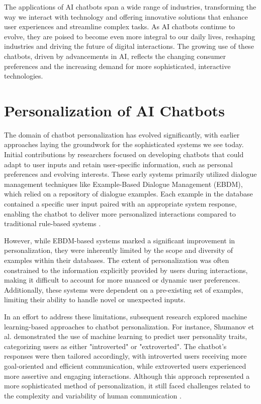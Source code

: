 The applications of AI chatbots span a wide range of industries, transforming the way we interact with technology and offering innovative solutions that enhance user experiences and streamline complex tasks. As AI chatbots continue to evolve, they are poised to become even more integral to our daily lives, reshaping industries and driving the future of digital interactions. The growing use of these chatbots, driven by advancements in AI, reflects the changing consumer preferences and the increasing demand for more sophisticated, interactive technologies.

\section{Personalization of AI Chatbots}

The domain of chatbot personalization has evolved significantly, with earlier approaches laying the groundwork for the sophisticated systems we see today. Initial contributions by researchers focused on developing chatbots that could adapt to user inputs and retain user-specific information, such as personal preferences and evolving interests. These early systems primarily utilized dialogue management techniques like Example-Based Dialogue Management (EBDM), which relied on a repository of dialogue examples. Each example in the database contained a specific user input paired with an appropriate system response, enabling the chatbot to deliver more personalized interactions compared to traditional rule-based systems \cite{kim2015acquisition, bang2015example}.

However, while EBDM-based systems marked a significant improvement in personalization, they were inherently limited by the scope and diversity of examples within their databases. The extent of personalization was often constrained to the information explicitly provided by users during interactions, making it difficult to account for more nuanced or dynamic user preferences. Additionally, these systems were dependent on a pre-existing set of examples, limiting their ability to handle novel or unexpected inputs.

In an effort to address these limitations, subsequent research explored machine learning-based approaches to chatbot personalization. For instance, Shumanov et al. demonstrated the use of machine learning to predict user personality traits, categorizing users as either "introverted" or "extroverted". The chatbot's responses were then tailored accordingly, with introverted users receiving more goal-oriented and efficient communication, while extroverted users experienced more assertive and engaging interactions. Although this approach represented a more sophisticated method of personalization, it still faced challenges related to the complexity and variability of human communication \cite{shumanov2021making}.


